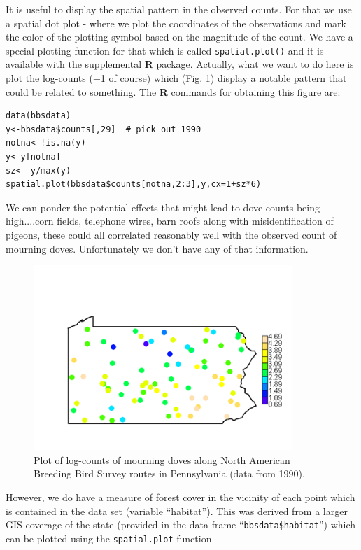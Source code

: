 It is useful to display the spatial pattern in the observed counts. For that we use a
spatial dot plot - where we plot the coordinates of the observations
and mark the color of the plotting symbol based on the magnitude of
the count.  We have a special plotting function for that which is
called \mbox{\tt spatial.plot()} and it is available with the
supplemental {\bf R} package.
Actually, what we want to do here is plot the
log-counts (+1 of course) which (Fig. \ref{glms.fig.padovecounts}) display a notable pattern that could
be related to something. The {\bf R} commands for obtaining this figure are:
{\small
\begin{verbatim}
data(bbsdata)
y<-bbsdata$counts[,29]  # pick out 1990
notna<-!is.na(y)
y<-y[notna]
sz<- y/max(y)
spatial.plot(bbsdata$counts[notna,2:3],y,cx=1+sz*6)
\end{verbatim}
}
 We can ponder the potential effects that
might lead to dove counts being high....corn fields, telephone wires,
barn roofs along with misidentification of pigeons, these could all
correlated reasonably well with the observed count of mourning doves.
Unfortunately we don't have any of that information.
\begin{figure}
\begin{center}
\includegraphics[height=2.75in]{Ch2-Bayes/figs/PA1}
\end{center}
\caption{Plot of log-counts of mourning doves along North American Breeding Bird Survey routes in Pennsylvania (data from 1990).}
\label{glms.fig.padovecounts}
\end{figure}
However, we do have a measure of forest cover in the vicinity of each point
which is contained in the data set (variable ``habitat''). This was derived
from a larger GIS coverage of the state (provided in the data frame
``\mbox{\tt bbsdata\$habitat}'') which can be plotted using the \mbox{\tt spatial.plot} function
